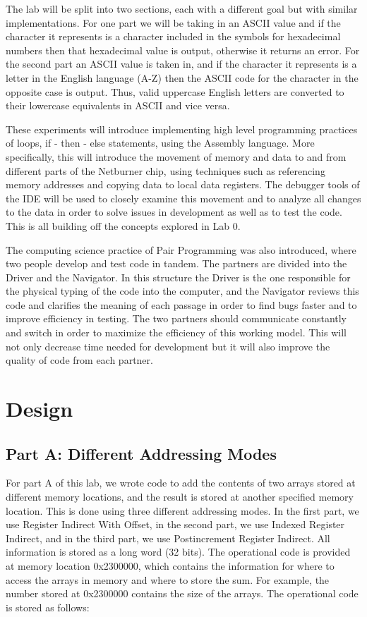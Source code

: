 \documentclass[letterpaper]{article}
\begin{document}
  The lab will be split into two sections, each with a different goal but with
  similar implementations. For one part we will be taking in an ASCII value and
  if the character it represents is a character included in the symbols for
  hexadecimal numbers then that hexadecimal value is output, otherwise it
  returns an error.  For the second part an ASCII value is taken in, and if the
  character it represents is a letter in the English language (A-Z) then the
  ASCII code for the character in the opposite case is output.  Thus, valid
  uppercase English letters are converted to their lowercase equivalents in
  ASCII and vice versa.

  These experiments will introduce implementing high level programming practices
  of loops, if - then - else statements, using the Assembly language. More
  specifically, this will introduce the movement of memory and data to and from
  different parts of the Netburner chip, using techniques such as referencing
  memory addresses and copying data to local data registers.  The debugger tools
  of the IDE will be used to closely examine this movement and to analyze all
  changes to the data in order to solve issues in development as well as to test
  the code.  This is all building off the concepts explored in Lab 0.

  The computing science practice of Pair Programming was also introduced, where
  two people develop and test code in tandem.  The partners are divided into the
  Driver and the Navigator. In this structure the Driver is the one responsible
  for the physical typing of the code into the computer, and the Navigator
  reviews this code and clarifies the meaning of each passage in order to find
  bugs faster and to improve efficiency in testing.  The two partners should
  communicate constantly and switch in order to maximize the efficiency of this
  working model. This will not only decrease time needed for development but it
  will also improve the quality of code from each partner.


\section{Design}

\subsection{Part A: Different Addressing Modes}
For part A of this lab, we wrote code to add the contents of two arrays
stored at different memory locations, and the result is stored at another
specified memory location. This is done using three  different addressing modes.
In the first part, we use Register Indirect With Offset, in the second part, we
use Indexed Register Indirect, and in the third part, we use Postincrement
Register Indirect. All information is stored as a long word (32 bits). The
operational code is provided at memory location 0x2300000, which contains the
information for where to access the arrays in memory and where to store the sum.
For example, the number stored at 0x2300000 contains the size of the arrays. The
operational code is stored as follows:
\end{document}

